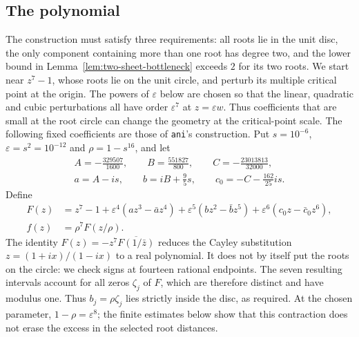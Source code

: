 \documentclass[11pt]{article}
\begin{document}
\subsection{The polynomial}
The construction must satisfy three requirements: all roots lie in the
unit disc, the only component containing more than one root has degree
two, and the lower bound in Lemma~\ref{lem:two-sheet-bottleneck} exceeds
$2$ for its two roots. We start near $z^7-1$, whose roots lie on the
unit circle, and perturb its multiple critical point at the origin. The powers of $\varepsilon$ below are chosen so that the
linear, quadratic and cubic perturbations all have order
$\varepsilon^7$ at $z=\varepsilon w$. Thus coefficients that are small
at the root circle can change the geometry at the critical-point scale.
The following fixed coefficients are those of \texttt{ani}'s construction.
Put $s=10^{-6}$, $\varepsilon=s^2=10^{-12}$ and $\rho=1-s^{16}$, and let
\begin{gather*}
 A=-\frac{329507}{1600},\qquad B=\frac{551827}{800},\qquad
 C=-\frac{23013813}{32000},\\
 a=A-is,\qquad b=iB+\frac95s,\qquad c_0=-C-\frac{162}{25}is.
\end{gather*}
Define
\begin{align}
 F(z)&=z^7-1+\varepsilon^4(az^3-\bar a z^4)
      +\varepsilon^5(bz^2-\bar b z^5)
      +\varepsilon^6(c_0z-\bar c_0z^6),\label{eq:ani-F}\\
 f(z)&=\rho^7F(z/\rho).\label{eq:ani-f}
\end{align}
The identity $F(z)=-z^7\overline{F(1/\bar z)}$ reduces the Cayley
substitution $z=(1+ix)/(1-ix)$ to a real polynomial. It does not by
itself put the roots on the circle: we check signs at fourteen rational
endpoints. The seven
resulting intervals account for all zeros $\zeta_j$ of $F$, which are
therefore distinct and have modulus one. Thus $b_j=\rho\zeta_j$ lies
strictly inside the disc, as required. At the chosen parameter,
$1-\rho=\varepsilon^8$; the finite estimates below show that this
contraction does not erase the excess in the selected root distances.
\end{document}
